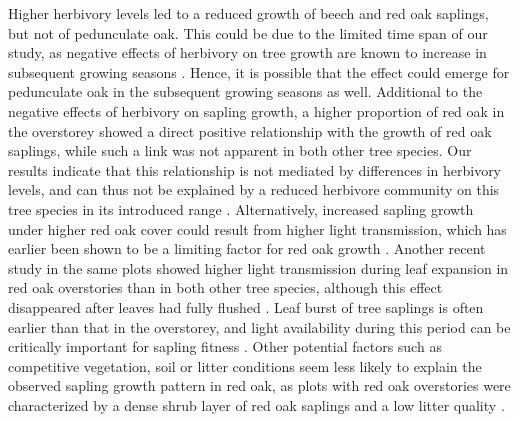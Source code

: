 \documentclass[10pt, twoside]{book} %
\begin{document}
	Higher herbivory levels led to a reduced growth of beech and red oak saplings, but not of pedunculate oak. This could be due to the limited time span of our study, as negative effects of herbivory on tree growth are known to increase in subsequent growing seasons \citep{Marquis1994, Mooney2007}. Hence, it is possible that the effect could emerge for pedunculate oak in the subsequent growing seasons as well. Additional to the negative effects of herbivory on sapling growth, a higher proportion of red oak in the overstorey showed a direct positive relationship with the growth of red oak saplings, while such a link was not apparent in both other tree species. Our results indicate that this relationship is not mediated by differences in herbivory levels, and can thus not be explained by a reduced herbivore community on this tree species in its introduced range \citep{Branco2015, Goßner2004}. Alternatively, increased sapling growth under higher red oak cover could result from higher light transmission, which has earlier been shown to be a limiting factor for red oak growth \citep{Dey1996}. Another recent study in the same plots showed higher light transmission during leaf expansion in red oak overstories than in both other tree species, although this effect disappeared after leaves had fully flushed \citep{Sercu2017}. Leaf burst of tree saplings is often earlier than that in the overstorey, and light availability during this period can be critically important for sapling fitness \citep{Augspurger2005}. Other potential factors such as competitive vegetation, soil or litter conditions seem less likely to explain the observed sapling growth pattern in red oak, as plots with red oak overstories were characterized by a dense shrub layer of red oak saplings and a low litter quality \citep{DeGroote2017, DeGroote2018}.\\
	
\end{document}
